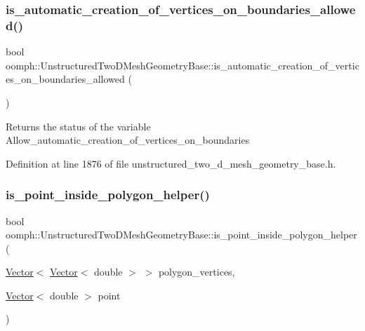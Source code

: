 \subsubsection{\texorpdfstring{is\+\_\+automatic\+\_\+creation\+\_\+of\+\_\+vertices\+\_\+on\+\_\+boundaries\+\_\+allowed()}{is\_automatic\_creation\_of\_vertices\_on\_boundaries\_allowed()}}
{\footnotesize\ttfamily bool oomph\+::\+Unstructured\+Two\+D\+Mesh\+Geometry\+Base\+::is\+\_\+automatic\+\_\+creation\+\_\+of\+\_\+vertices\+\_\+on\+\_\+boundaries\+\_\+allowed (\begin{DoxyParamCaption}{ }\end{DoxyParamCaption})\hspace{0.3cm}{\ttfamily [inline]}}

Returns the status of the variable Allow\+\_\+automatic\+\_\+creation\+\_\+of\+\_\+vertices\+\_\+on\+\_\+boundaries 

Definition at line 1876 of file unstructured\+\_\+two\+\_\+d\+\_\+mesh\+\_\+geometry\+\_\+base.\+h.

\mbox{\label{classoomph_1_1UnstructuredTwoDMeshGeometryBase_adc3f1f9607dcf468c6cfb458538248df}} 
\subsubsection{\texorpdfstring{is\+\_\+point\+\_\+inside\+\_\+polygon\+\_\+helper()}{is\_point\_inside\_polygon\_helper()}}
{\footnotesize\ttfamily bool oomph\+::\+Unstructured\+Two\+D\+Mesh\+Geometry\+Base\+::is\+\_\+point\+\_\+inside\+\_\+polygon\+\_\+helper (\begin{DoxyParamCaption}\item[{\hyperlink{classoomph_1_1Vector}{Vector}$<$ \hyperlink{classoomph_1_1Vector}{Vector}$<$ double $>$ $>$}]{polygon\+\_\+vertices,  }\item[{\hyperlink{classoomph_1_1Vector}{Vector}$<$ double $>$}]{point }\end{DoxyParamCaption})}



